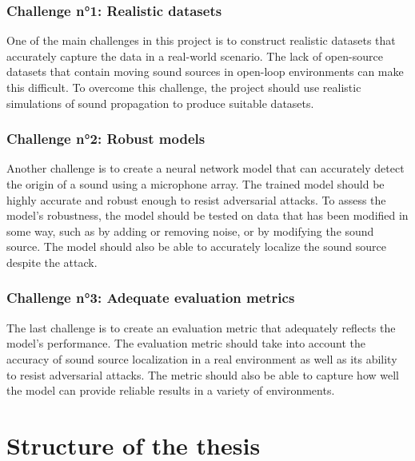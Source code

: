 \subsubsection{Challenge n°1: Realistic datasets}

One of the main challenges in this project is to construct realistic datasets that accurately capture the data in a real-world scenario. The lack of open-source datasets that contain moving sound sources in open-loop environments can make this difficult. To overcome this challenge, the project should use realistic simulations of sound propagation to produce suitable datasets.

\subsubsection{Challenge n°2: Robust models}

Another challenge is to create a neural network model that can accurately detect the origin of a sound using a microphone array. The trained model should be highly accurate and robust enough to resist adversarial attacks. To assess the model's robustness, the model should be tested on data that has been modified in some way, such as by adding or removing noise, or by modifying the sound source. The model should also be able to accurately localize the sound source despite the attack.

\subsubsection{Challenge n°3: Adequate evaluation metrics}

The last challenge is to create an evaluation metric that adequately reflects the model's performance. The evaluation metric should take into account the accuracy of sound source localization in a real environment as well as its ability to resist adversarial attacks. The metric should also be able to capture how well the model can provide reliable results in a variety of environments.
\section{Structure of the thesis}


